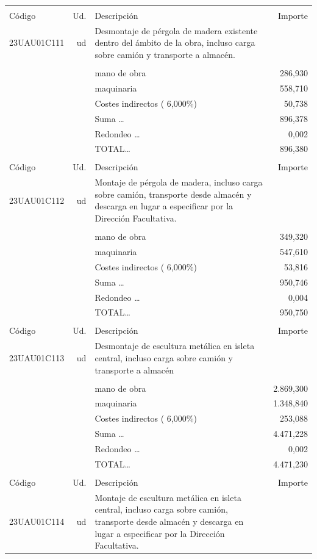 \documentclass{book}%
\begin{document}
\begin{supertabular}{l r p{60mm} r}
&&&\\%
Código&Ud.&Descripción&Importe\\%
\hline%
23UAU01C111&ud&Desmontaje de pérgola de madera existente dentro del ámbito de la obra, incluso carga sobre camión y transporte a almacén.&\\%
&&&\\%
&&mano de obra&   286,930\\%
&&maquinaria&   558,710\\%
&&Costes indirectos (     6,000\%)&    50,738\\%
&&Suma \ldots&   896,378\\%
&&Redondeo \ldots&     0,002\\%
%
&&TOTAL\ldots&   896,380\\%
&&&\\%
Código&Ud.&Descripción&Importe\\%
\hline%
23UAU01C112&ud&Montaje de pérgola de madera, incluso carga sobre camión, transporte desde almacén y descarga en lugar a especificar por la Dirección Facultativa.&\\%
&&&\\%
&&mano de obra&   349,320\\%
&&maquinaria&   547,610\\%
&&Costes indirectos (     6,000\%)&    53,816\\%
&&Suma \ldots&   950,746\\%
&&Redondeo \ldots&     0,004\\%
%
&&TOTAL\ldots&   950,750\\%
&&&\\%
Código&Ud.&Descripción&Importe\\%
\hline%
23UAU01C113&ud&Desmontaje de escultura metálica en isleta central, incluso carga sobre camión y transporte a almacén&\\%
&&&\\%
&&mano de obra& 2.869,300\\%
&&maquinaria& 1.348,840\\%
&&Costes indirectos (     6,000\%)&   253,088\\%
&&Suma \ldots& 4.471,228\\%
&&Redondeo \ldots&     0,002\\%
%
&&TOTAL\ldots& 4.471,230\\%
&&&\\%
Código&Ud.&Descripción&Importe\\%
\hline%
23UAU01C114&ud&Montaje de escultura metálica en isleta central, incluso carga sobre camión, transporte desde almacén y descarga en lugar a especificar por la Dirección Facultativa.&\\%

\end{supertabular}
\end{document}
